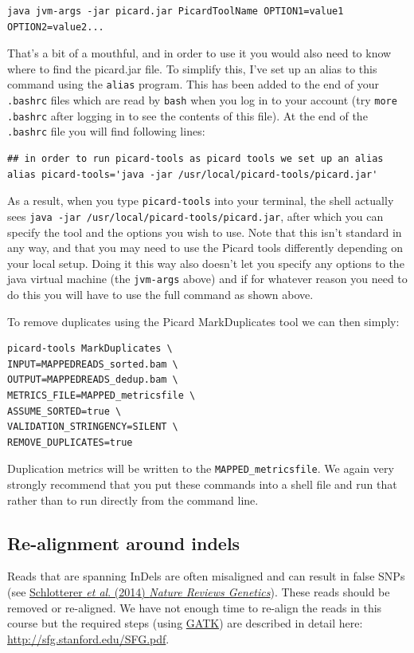 \documentclass[11pt]{article}
\begin{document}
\begin{verbatim}
java jvm-args -jar picard.jar PicardToolName OPTION1=value1 OPTION2=value2...
\end{verbatim}

That's a bit of a mouthful, and in order to use it you would also need to know where
to find the picard.jar file. To simplify this, I've set up an alias to
this command using the \texttt{alias} program. This has been added to the end
of your \texttt{.bashrc} files which are read by \texttt{bash} when you log in to
your account (try \texttt{more .bashrc} after logging in to see the contents
of this file). At the end of the \texttt{.bashrc} file you will find following
lines:

\begin{verbatim}
## in order to run picard-tools as picard tools we set up an alias
alias picard-tools='java -jar /usr/local/picard-tools/picard.jar'
\end{verbatim}

As a result, when you type \texttt{picard-tools} into your terminal, the shell actually sees
\texttt{java -jar /usr/local/picard-tools/picard.jar}, after which you can specify the
tool and the options you wish to use. Note that this isn't standard in any way,
and that you may need to use the Picard tools differently depending on your
local setup. Doing it this way also doesn't let you specify any options to the
java virtual machine (the \texttt{jvm-args} above) and if for whatever reason you need
to do this you will have to use the full command as shown above.

To remove duplicates using the Picard MarkDuplicates tool we can then simply:

\begin{verbatim}
picard-tools MarkDuplicates \
INPUT=MAPPEDREADS_sorted.bam \
OUTPUT=MAPPEDREADS_dedup.bam \
METRICS_FILE=MAPPED_metricsfile \
ASSUME_SORTED=true \
VALIDATION_STRINGENCY=SILENT \
REMOVE_DUPLICATES=true
\end{verbatim}

Duplication metrics will be written to the \texttt{MAPPED\_metricsfile}. We again
very strongly recommend that you put these commands into a shell file and run
that rather than to run directly from the command line.


\subsection{Re-alignment around indels}
\label{sec:orgheadline6}
Reads that are spanning InDels are often misaligned and can result in
false SNPs (see \href{http://www.nature.com/nrg/journal/v15/n11/full/nrg3803.html}{Schlotterer \emph{et al}. (2014) \emph{Nature Reviews
Genetics}}). These reads should be removed or re-aligned. We have not
enough time to re-align the reads in this course but the required
steps (using \href{https://www.broadinstitute.org/gatk/}{GATK}) are described in detail here:
\url{http://sfg.stanford.edu/SFG.pdf}.
\end{document}
